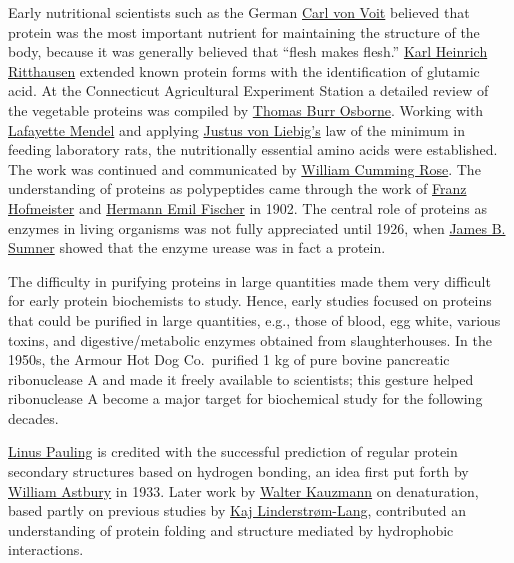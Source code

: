 Early nutritional scientists such as the German \href{https://en.wikipedia.org/wiki/Carl_von_Voit}{Carl von Voit} believed that protein was the most important nutrient for maintaining the structure of the body, because it was generally believed that ``flesh makes flesh.'' \href{https://en.wikipedia.org/wiki/Karl_Heinrich_Ritthausen}{Karl Heinrich Ritthausen} extended known protein forms with the identification of glutamic acid. At the Connecticut Agricultural Experiment Station a detailed review of the vegetable proteins was compiled by \href{https://en.wikipedia.org/wiki/Thomas_Burr_Osborne_(chemist)}{Thomas Burr Osborne}. Working with \href{https://en.wikipedia.org/wiki/Lafayette_Mendel}{Lafayette Mendel} and applying \href{https://en.wikipedia.org/wiki/Justus_von_Liebig}{Justus von Liebig's} law of the minimum in feeding laboratory rats, the nutritionally essential amino acids were established. The work was continued and communicated by \href{https://en.wikipedia.org/wiki/William_Cumming_Rose}{William Cumming Rose}. The understanding of proteins as polypeptides came through the work of \href{https://en.wikipedia.org/wiki/Franz_Hofmeister}{Franz Hofmeister} and \href{https://en.wikipedia.org/wiki/Emil_Fischer}{Hermann Emil Fischer} in 1902. The central role of proteins as enzymes in living organisms was not fully appreciated until 1926, when \href{https://en.wikipedia.org/wiki/James_B._Sumner}{James B. Sumner} showed that the enzyme urease was in fact a protein.

The difficulty in purifying proteins in large quantities made them very difficult for early protein biochemists to study. Hence, early studies focused on proteins that could be purified in large quantities, e.g., those of blood, egg white, various toxins, and digestive/metabolic enzymes obtained from slaughterhouses. In the 1950s, the Armour Hot Dog Co.~purified 1 kg of pure bovine pancreatic ribonuclease A and made it freely available to scientists; this gesture helped ribonuclease A become a major target for biochemical study for the following decades.

\href{https://en.wikipedia.org/wiki/Linus_Pauling}{Linus Pauling} is credited with the successful prediction of regular protein secondary structures based on hydrogen bonding, an idea first put forth by \href{https://en.wikipedia.org/wiki/William_Astbury}{William Astbury} in 1933. Later work by \href{https://en.wikipedia.org/wiki/Walter_Kauzmann}{Walter Kauzmann} on denaturation, based partly on previous studies by \href{https://en.wikipedia.org/wiki/Kaj_Ulrik_Linderstrøm-Lang}{Kaj Linderstrøm-Lang}, contributed an understanding of protein folding and structure mediated by hydrophobic interactions.

